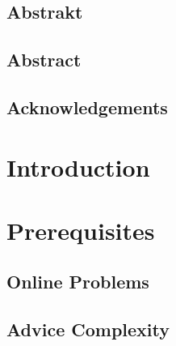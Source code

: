 \documentclass[12pt,a4paper]{report}
\begin{document}
\eject %




\eject

%

\eject

\section*{Abstrakt}


\eject

\section*{Abstract}


\eject

\section*{Acknowledgements}


\eject

\tableofcontents


\chapter*{Introduction}
\setcounter{page}{1}
\label{chapter:intro}


\chapter{Prerequisites}
\label{chapter:first}

\section{Online Problems}
\label{section:online}

\section{Advice Complexity}
\label{section:advice}

\end{document}
